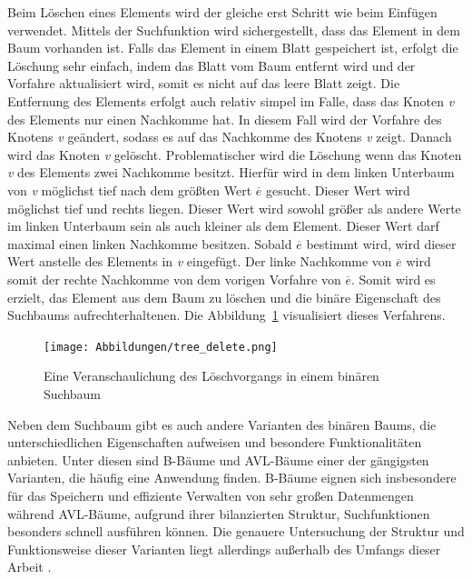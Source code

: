 Beim Löschen eines Elements wird der gleiche erst Schritt wie beim Einfügen verwendet. Mittels der Suchfunktion wird sichergestellt, dass das Element in dem Baum vorhanden ist. Falls das Element in einem Blatt gespeichert ist, erfolgt die Löschung sehr einfach, indem das Blatt vom Baum entfernt wird und der Vorfahre aktualisiert wird, somit es nicht auf das leere Blatt zeigt. Die Entfernung des Elements erfolgt auch relativ simpel im Falle, dass das Knoten \textit{v} des Elements nur einen Nachkomme hat. In diesem Fall wird der Vorfahre des Knotens \textit{v} geändert, sodass es auf das Nachkomme des Knotens \textit{v} zeigt. Danach wird das Knoten \textit{v} gelöscht. Problematischer wird die Löschung wenn das Knoten \textit{v} des Elements zwei Nachkomme besitzt. Hierfür wird in dem linken Unterbaum von \textit{v} möglichst tief nach dem größten Wert \textit{$\overline{e}$} gesucht. Dieser Wert wird möglichst tief und rechts liegen. Dieser Wert wird sowohl größer als andere Werte im linken Unterbaum sein als auch kleiner als dem Element. Dieser Wert darf maximal einen linken Nachkomme besitzen. Sobald \textit{$\overline{e}$} bestimmt wird, wird dieser Wert anstelle des Elements in \textit{v} eingefügt. Der linke Nachkomme von \textit{$\overline{e}$} wird somit der rechte Nachkomme von dem vorigen Vorfahre von \textit{$\overline{e}$}. Somit wird es erzielt, das Element aus dem Baum zu löschen und die binäre Eigenschaft des Suchbaums aufrechterhaltenen. Die Abbildung~\ref{fig: tree_delete} visualisiert dieses Verfahrens. \autocite[140-141]{knebl_algorithmen_2021}

\begin{figure}[!b]
	\texttt{[image: Abbildungen/tree\_delete.png]}
	\centering
	\caption{Eine Veranschaulichung des Löschvorgangs in einem binären Suchbaum \autocite[140]{knebl_algorithmen_2021}}
	\label{fig: tree_delete}
\end{figure}

Neben dem Suchbaum gibt es auch andere Varianten des binären Baums, die unterschiedlichen Eigenschaften aufweisen und besondere Funktionalitäten anbieten. Unter diesen sind B-Bäume und AVL-Bäume einer der gängigsten Varianten, die häufig eine Anwendung finden. B-Bäume eignen sich insbesondere für das Speichern und effiziente Verwalten von sehr großen Datenmengen während AVL-Bäume, aufgrund ihrer bilanzierten Struktur, Suchfunktionen besonders schnell ausführen können. Die genauere Untersuchung der Struktur und Funktionsweise dieser Varianten liegt allerdings außerhalb des Umfangs dieser Arbeit \autocite[407-412]{gumm_band_2016}.

